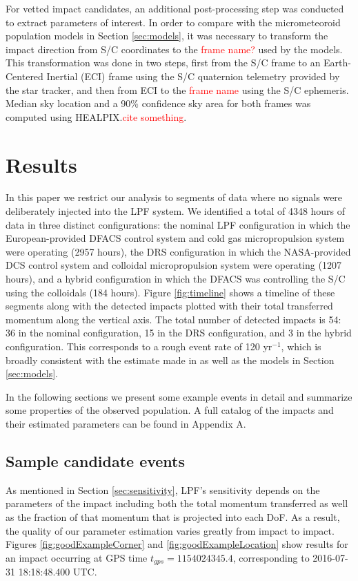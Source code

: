 \documentclass[twocolumn, trackchanges]{aastex62}
\newcommand{\red}[1]{\textcolor{red}{#1}}
\newcommand{\nhours}{4348 }
\begin{document}
For vetted impact candidates, an additional post-processing step was conducted to extract parameters of interest.  In order to compare with the micrometeoroid population models in Section \ref{sec:models}, it was necessary to transform the impact direction from S/C coordinates to the \red{frame name?} used by the models.  This transformation was done in two steps, first from the S/C frame to an Earth-Centered Inertial (ECI) frame using the S/C quaternion telemetry provided by the star tracker, and then from ECI to the \red{frame name} using the S/C ephemeris. Median sky location and a 90\% confidence sky area for both frames was computed using HEALPIX.\red{cite something}.



\section{Results} \label{sec:results}
In this paper we restrict our analysis to segments of data where no signals were deliberately injected into the LPF system. We identified a total of \nhours hours of data in three distinct configurations: the nominal LPF configuration in which the European-provided DFACS control system and cold gas micropropulsion system were operating (2957 hours), the DRS configuration in which the NASA-provided DCS control system and colloidal micropropulsion system were operating (1207 hours), and a hybrid configuration in which the DFACS was controlling the S/C using the colloidals (184 hours). Figure \ref{fig:timeline} shows a timeline of these segments along with the detected impacts plotted with their total transferred momentum along the vertical axis. The total number of detected impacts is 54: 36 in the nominal configuration, 15 in the DRS configuration, and 3 in the hybrid configuration. This corresponds to a rough event rate of 120 yr$^{-1}$, which is broadly consistent with the estimate made in \cite{Thorpe:2015cxa} as well as the models in Section \ref{sec:models}. 

In the following sections we present some example events in detail and summarize some properties of the observed population.  A full catalog of the impacts and their estimated parameters can be found in Appendix A.



\subsection{Sample candidate events \label{sec:samples}}
As mentioned in Section \ref{sec:sensitivity}, LPF's sensitivity depends on the parameters of the impact including both the total momentum transferred as well as the fraction of that momentum that is  projected into each DoF.  As a result, the quality of our parameter estimation varies greatly from impact to impact.  Figures \ref{fig:goodExampleCorner} and \ref{fig:goodExampleLocation} show results for an impact occurring at GPS time $t_{gps}=1154024345.4$, corresponding to 2016-07-31 18:18:48.400 UTC. 
\end{document}
